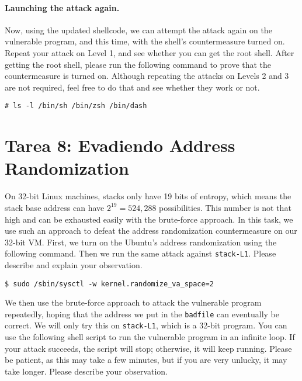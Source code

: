 \paragraph{Launching the attack again.}
Now, using the updated shellcode, we can attempt the attack 
again on the vulnerable program, and this time, with the 
shell's countermeasure turned on. Repeat your attack
on Level 1, and see whether 
you can get the root shell. After getting the root shell,
please run the following command to prove that the countermeasure
is turned on. Although repeating the attacks on Levels 2 and 3 
are not required, feel free to do that and see whether they work or not.

\begin{lstlisting}
# ls -l /bin/sh /bin/zsh /bin/dash
\end{lstlisting}
 


\section{Tarea 8: Evadiendo Address Randomization}

On 32-bit Linux machines, stacks only have 19 bits of entropy, which means the stack base
address can have $2^{19} = 524,288$ possibilities.  This number is not that high and can be
exhausted easily with the brute-force approach. In this task,
we use such an approach to defeat the address randomization countermeasure 
on our 32-bit VM. 
First, we turn on the Ubuntu's address randomization using the 
following command. Then we run the same attack
against \texttt{stack-L1}.
Please describe and explain your observation.

\begin{lstlisting}
$ sudo /sbin/sysctl -w kernel.randomize_va_space=2
\end{lstlisting}


We then use the brute-force approach to attack the vulnerable program repeatedly, hoping that 
the address we put in the \texttt{badfile} can eventually be correct. We will only try
this on \texttt{stack-L1}, which is a 32-bit program. 
You can use the following shell script to run the vulnerable program in an infinite loop. If your
attack succeeds, the script will stop; otherwise, it will keep running. Please be patient,
as this may take a few minutes, but if you are very unlucky,
it may take longer. Please describe your observation.


